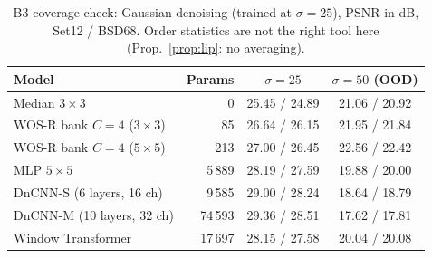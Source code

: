 \begin{table}[t]\centering\small
\caption{B3 coverage check: Gaussian denoising (trained at $\sigma=25$), PSNR in dB, Set12 / BSD68. Order statistics are not the right tool here (Prop.~\ref{prop:lip}: no averaging).}\label{tab:b3g}
\begin{tabular}{lrcc}\toprule Model & Params & $\sigma=25$ & $\sigma=50$ (OOD)\\\midrule
Median $3{\times}3$ & 0 & 25.45 / 24.89 & 21.06 / 20.92\\
WOS-R bank $C{=}4$ ($3{\times}3$) & 85 & 26.64 / 26.15 & 21.95 / 21.84\\
WOS-R bank $C{=}4$ ($5{\times}5$) & 213 & 27.00 / 26.45 & 22.56 / 22.42\\
MLP $5{\times}5$ & 5\,889 & 28.19 / 27.59 & 19.88 / 20.00\\
DnCNN-S (6 layers, 16 ch) & 9\,585 & 29.00 / 28.24 & 18.64 / 18.79\\
DnCNN-M (10 layers, 32 ch) & 74\,593 & 29.36 / 28.51 & 17.62 / 17.81\\
Window Transformer & 17\,697 & 28.15 / 27.58 & 20.04 / 20.08\\
\bottomrule\end{tabular}\end{table}